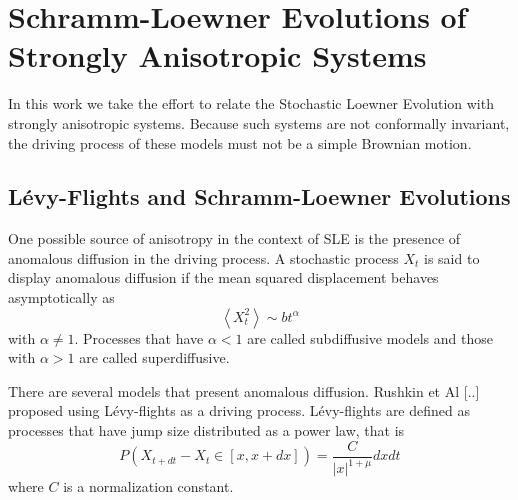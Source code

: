 \chapter{Schramm-Loewner Evolutions of Strongly Anisotropic Systems}
\label{ch:res}

In this work we take the effort to relate the Stochastic Loewner Evolution with
strongly anisotropic systems. Because such systems are not conformally
invariant, the driving process of these models must not be a simple Brownian
motion.

\section{Lévy-Flights and Schramm-Loewner Evolutions}

One possible source of anisotropy in the context of SLE is the presence of
anomalous diffusion in the driving process. A stochastic process $X_t$ is
said to display anomalous diffusion if the mean squared displacement
behaves asymptotically as
\begin{equation}
    \left\langle X_t^2 \right\rangle \sim bt^\alpha
\end{equation}
with $\alpha\neq 1$. Processes that have $\alpha < 1$ are called subdiffusive
models and those with $\alpha > 1$ are called superdiffusive.

There are several models that present anomalous diffusion. Rushkin et Al [..]
proposed using L\'evy-flights as a driving process. L\'evy-flights are defined as
processes that have jump size distributed as a power law, that is
\begin{equation}
    P(X_{t+dt} - X_t \in [x, x+dx]) = \frac{C}{|x|^{1+\mu}}dxdt
\end{equation}
where $C$ is a normalization constant.

